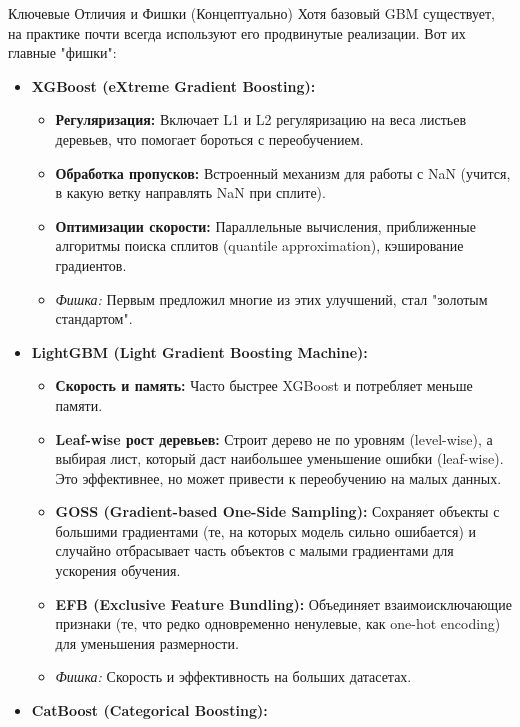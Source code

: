 \begin{alerttextbox}{Ключевые Отличия и Фишки (Концептуально)}
    Хотя базовый GBM существует, на практике почти всегда используют его продвинутые реализации. Вот их главные "фишки":
    \begin{itemize}
        \item \textbf{XGBoost (eXtreme Gradient Boosting):}
            \begin{itemize}
                \item \textbf{Регуляризация:} Включает L1 и L2 регуляризацию на веса листьев деревьев, что помогает бороться с переобучением.
                \item \textbf{Обработка пропусков:} Встроенный механизм для работы с NaN (учится, в какую ветку направлять NaN при сплите).
                \item \textbf{Оптимизации скорости:} Параллельные вычисления, приближенные алгоритмы поиска сплитов (quantile approximation), кэширование градиентов.
                \item \textit{Фишка:} Первым предложил многие из этих улучшений, стал "золотым стандартом".
            \end{itemize}
        \item \textbf{LightGBM (Light Gradient Boosting Machine):}
            \begin{itemize}
                \item \textbf{Скорость и память:} Часто быстрее XGBoost и потребляет меньше памяти.
                \item \textbf{Leaf-wise рост деревьев:} Строит дерево не по уровням (level-wise), а выбирая лист, который даст наибольшее уменьшение ошибки (leaf-wise). Это эффективнее, но может привести к переобучению на малых данных.
                \item \textbf{GOSS (Gradient-based One-Side Sampling):} Сохраняет объекты с большими градиентами (те, на которых модель сильно ошибается) и случайно отбрасывает часть объектов с малыми градиентами для ускорения обучения.
                \item \textbf{EFB (Exclusive Feature Bundling):} Объединяет взаимоисключающие признаки (те, что редко одновременно ненулевые, как one-hot encoding) для уменьшения размерности.
                \item \textit{Фишка:} Скорость и эффективность на больших датасетах.
            \end{itemize}
        \item \textbf{CatBoost (Categorical Boosting):}

\end{itemize}
\end{alerttextbox}
